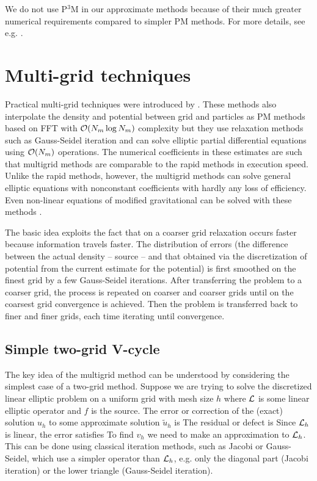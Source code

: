 We do not use P$^3$M in our approximate methods because of their much greater numerical requirements compared to simpler PM methods. For more details, see e.g. \textcite{Hockney:1988:CSU:62815}.
\section{Multi-grid techniques}
Practical multi-grid techniques were introduced by \textcite{10.2307/2006422}. These methods also interpolate the density and potential between grid and particles as PM methods based on FFT with $\mathcal{O}(N_m\log N_m)$ complexity but they use relaxation methods such as Gauss-Seidel iteration \parencite{doi:10.1002/zamm.19720520813} and can solve elliptic partial differential equations using $\mathcal{O}(N_m)$ operations. The numerical coefficients in these estimates are such that multigrid methods are comparable to the rapid methods in execution speed. Unlike the rapid methods, however, the multigrid methods can solve general elliptic equations with nonconstant coefficients with hardly any loss of efficiency. Even non-linear equations of modified gravitational can be solved with these methods \parencite{10.5555/42249}.

The basic idea exploits the fact that on a coarser grid relaxation occurs faster because information travels faster. The distribution of errors (the difference between the actual density -- source -- and that obtained via the discretization of potential from the current estimate for the potential) is first smoothed on the finest grid by a few Gauss-Seidel iterations. After transferring the problem to a coarser grid, the process is repeated on coarser and coarser grids until on the coarsest grid convergence is achieved. Then the problem is transferred back to finer and finer grids, each time iterating until convergence.
\subsection{Simple two-grid V-cycle}
The key idea of the multigrid method can be understood by considering the simplest case of a two-grid method. Suppose we are trying to solve the discretized linear elliptic problem on a uniform grid with mesh size $h$
where $\mathcal{L}$ is some linear elliptic operator and $f$ is the source. The error or correction of the (exact) solution $u_h$ to some approximate solution $\tilde u_h$ is
The residual or defect is
Since $\mathcal{L}_h$ is linear, the error satisfies
To find $v_h$ we need to make an approximation to $\mathcal{L}_h$. This can be done using classical iteration methods, such as Jacobi or Gauss-Seidel, which use a simpler operator than $\mathcal{L}_h$, e.g. only the diagonal part (Jacobi iteration) or the lower triangle (Gauss-Seidel iteration).

